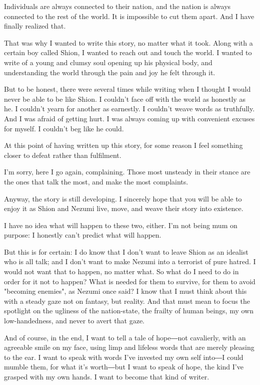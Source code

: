 Individuals are always connected to their nation, and the nation is
always connected to the rest of the world. It is impossible to cut them
apart. And I have finally realized that.

That was why I wanted to write this story, no matter what it took. Along
with a certain boy called Shion, I wanted to reach out and touch the
world. I wanted to write of a young and clumsy soul opening up his
physical body, and understanding the world through the pain and joy he
felt through it.

But to be honest, there were several times while writing when I thought
I would never be able to be like Shion. I couldn't face off with the
world as honestly as he. I couldn't yearn for another as earnestly. I
couldn't weave words as truthfully. And I was afraid of getting hurt. I
was always coming up with convenient excuses for myself. I couldn't beg
like he could.

At this point of having written up this story, for some reason I feel
something closer to defeat rather than fulfilment.

I'm sorry, here I go again, complaining. Those most unsteady in their
stance are the ones that talk the most, and make the most complaints.

Anyway, the story is still developing. I sincerely hope that you will be
able to enjoy it as Shion and Nezumi live, move, and weave their story
into existence.

I have no idea what will happen to these two, either. I'm not being mum
on purpose: I honestly can't predict what will happen.

But this is for certain: I do know that I don't want to leave Shion as
an idealist who is all talk; and I don't want to make Nezumi into a
terrorist of pure hatred. I would not want that to happen, no matter
what. So what do I need to do in order for it not to happen? What is
needed for them to survive, for them to avoid "becoming enemies", as
Nezumi once said? I know that I must think about this with a steady gaze
not on fantasy, but reality. And that must mean to focus the spotlight
on the ugliness of the nation-state, the frailty of human beings, my own
low-handedness, and never to avert that gaze.

And of course, in the end, I want to tell a tale of hope―not cavalierly,
with an agreeable smile on my face, using limp and lifeless words that
are merely pleasing to the ear. I want to speak with words I've invested
my own self into―I could mumble them, for what it's worth―but I want to
speak of hope, the kind I've grasped with my own hands. I want to become
that kind of writer.

